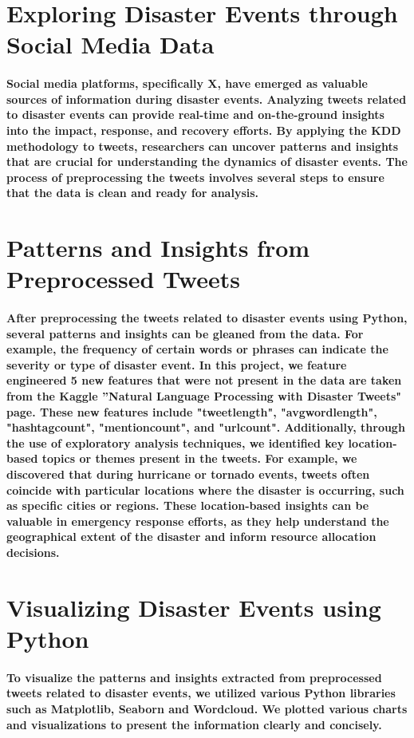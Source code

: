 \documentclass{article}
\begin{document}
\section{Exploring Disaster Events through Social Media Data}
\paragraph{Social media platforms, specifically X, have emerged as valuable sources of information during disaster events. Analyzing tweets related to disaster events can provide real-time and on-the-ground insights into the impact, response, and recovery efforts. By applying the KDD methodology to tweets, researchers can uncover patterns and insights that are crucial for understanding the dynamics of disaster events. The process of preprocessing the tweets involves several steps to ensure that the data is clean and ready for analysis.}
\section{Patterns and Insights from Preprocessed Tweets}
\paragraph{After preprocessing the tweets related to disaster events using Python, several patterns and insights can be gleaned from the data. For example, the frequency of certain words or phrases can indicate the severity or type of disaster event. In this project, we feature engineered 5 new features that were not present in the data are taken from the Kaggle ''Natural Language Processing with Disaster Tweets" page. These new features include "tweetlength", "avgwordlength", "hashtagcount", "mentioncount", and "urlcount". Additionally, through the use of exploratory analysis techniques, we identified key location-based topics or themes present in the tweets. For example, we discovered that during hurricane or tornado events, tweets often coincide with particular locations where the disaster is occurring, such as specific cities or regions. These location-based insights can be valuable in emergency response efforts, as they help understand the geographical extent of the disaster and inform resource allocation decisions.}
\section{Visualizing Disaster Events using Python}
\paragraph{To visualize the patterns and insights extracted from preprocessed tweets related to disaster events, we utilized various Python libraries such as Matplotlib, Seaborn and Wordcloud. We plotted various charts and visualizations to present the information clearly and concisely.}
\end{document}
